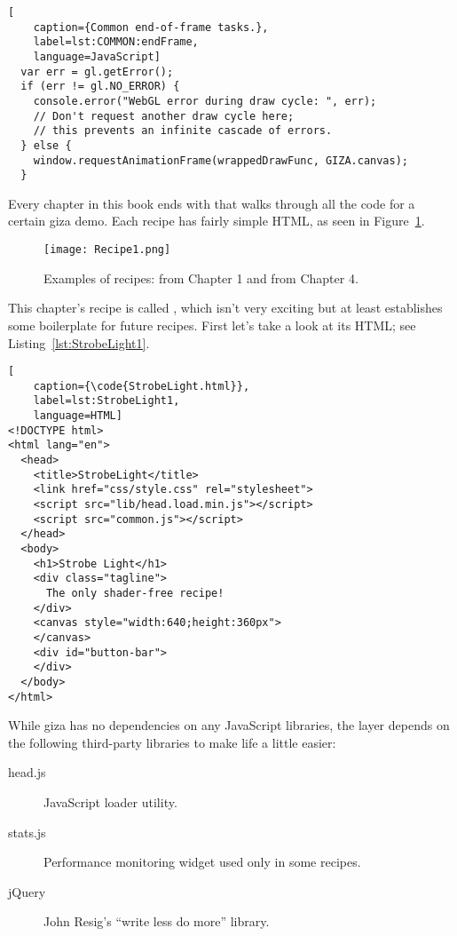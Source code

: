 \begin{lstlisting}[
    caption={Common end-of-frame tasks.},
    label=lst:COMMON:endFrame,
    language=JavaScript]
  var err = gl.getError();
  if (err != gl.NO_ERROR) {
    console.error("WebGL error during draw cycle: ", err);
    // Don't request another draw cycle here;
    // this prevents an infinite cascade of errors.
  } else {
    window.requestAnimationFrame(wrappedDrawFunc, GIZA.canvas);
  }
\end{lstlisting} 


Every chapter in this book ends with  that walks through all the code for a certain giza demo.  Each recipe has fairly simple HTML, as seen in Figure~\ref{fig:Recipe1}.

\begin{figure}[htb]\centering
  \texttt{[image: Recipe1.png]}
  \caption{Examples of recipes:  from Chapter 1 and  from Chapter 4.}
  \label{fig:Recipe1}
\end{figure}

This chapter's recipe is called , which isn't very exciting but at least establishes some boilerplate for future recipes.  First let's take a look at its HTML; see Listing~\ref{lst:StrobeLight1}.

\begin{lstlisting}[
    caption={\code{StrobeLight.html}},
    label=lst:StrobeLight1,
    language=HTML]
<!DOCTYPE html>
<html lang="en">
  <head>
    <title>StrobeLight</title>
    <link href="css/style.css" rel="stylesheet">
    <script src="lib/head.load.min.js"></script>
    <script src="common.js"></script>
  </head>
  <body>
    <h1>Strobe Light</h1>
    <div class="tagline">
      The only shader-free recipe!
    </div>
    <canvas style="width:640;height:360px">
    </canvas>
    <div id="button-bar">
    </div>
  </body>
</html>
\end{lstlisting} 

While giza has no dependencies on any JavaScript libraries, the  layer depends on the following third-party libraries to make life a little easier:

\begin{description}
\item[head.js] JavaScript loader utility.
\item[stats.js] Performance monitoring widget used only in some recipes.
\item[jQuery] John Resig's ``write less do more'' library.
\end{description}

